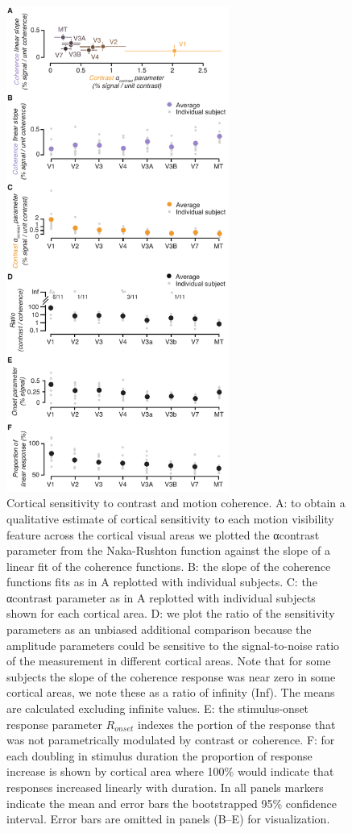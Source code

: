 \begin{figure}
\centering
\includegraphics[keepaspectratio,width=0.65\textwidth]{figs_c2/Fig6_sensitivity.pdf}
\caption[Cortical sensitivity to contrast and motion coherence]{Cortical sensitivity to contrast and motion coherence. A: to obtain a qualitative estimate of cortical sensitivity to each motion visibility feature across the cortical visual areas we plotted the αcontrast parameter from the Naka-Rushton function against the slope of a linear fit of the coherence functions. B: the slope of the coherence functions fits as in A replotted with individual subjects. C: the αcontrast parameter as in A replotted with individual subjects shown for each cortical area. D: we plot the ratio of the sensitivity parameters as an unbiased additional comparison because the amplitude parameters could be sensitive to the signal-to-noise ratio of the measurement in different cortical areas. Note that for some subjects the slope of the coherence response was near zero in some cortical areas, we note these as a ratio of infinity (Inf). The means are calculated excluding infinite values. E: the stimulus-onset response parameter $R_{onset}$ indexes the portion of the response that was not parametrically modulated by contrast or coherence. F: for each doubling in stimulus duration the proportion of response increase is shown by cortical area where 100\% would indicate that responses increased linearly with duration. In all panels markers indicate the mean and error bars the bootstrapped 95\% confidence interval. Error bars are omitted in panels (B–E) for visualization.}

\end{figure}
